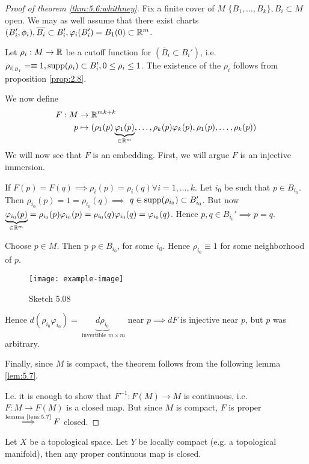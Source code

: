 \begin{proof}[Proof of theorem \ref{thm:5.6:whithney}]
    Fix a finite cover of \(M\) \(\{B_1,\dots,B_k\},B_i\subset M\) open. We may as well assume 
    that there exist charts \((B_i',\phi_i),\overline{B_i}\subset B_i',\varphi_i(B_i')=B_1(0)\subset \mathbb{R}^m\).

    Let \(\rho_i:M\to \mathbb{R}\) be a cutoff function for \((\overline{B}_i\subset B_i')\), i.e. \(\rho_{i\mid_{B_i}}=\equiv 1,\text{supp} (\rho_i)\subset B_i',0\leq \rho_i\leq 1\).
    The existence of the \(\rho_i\) follows from proposition \ref{prop:2.8}. 

    We now define 
    \begin{align*}
        F:M&\to \mathbb{R}^{mk+k}\\
        p&\mapsto (\rho_1(p)\underbrace{\varphi_1(p)}_{\in \mathbb{R}^m},\dots,\rho_k(p)\varphi_k(p),\rho_1(p),\dots,\rho_k(p))
    \end{align*}
    We will now see that \(F\) is an embedding. First, we will argue \(F\) is an injective immersion.

    If \(F(p)=F(q)\implies \rho_i(p)=\rho_i(q)\forall i=1,\dots,k\). Let \(i_0\) be such that \(p\in B_{i_0}\). Then 
    \(\rho_{i_0}(p)=1=\rho_{i_0}(q)\implies\) \(q\in \text{supp}(\rho_{i_0})\subset B_{i_0}'\). But 
    now \(\underbrace{\varphi_{i_0}(p)}_{\in\mathbb{R}^m} = \rho_{i_0}(p)\varphi_{i_0}(p)=\rho_{i_0}(q)\varphi_{i_0}(q)=\varphi_{i_0}(q)\). Hence \(p,q\in B_{i_0}'\implies p=q\).

     Choose \(p\in M\). Then p \(p\in B_{i_0}\), for some 
    \(i_0\). Hence \(\rho_{i_0}\equiv 1\) for some neighborhood of \(p\).
    \begin{figure}[H]
        \centering
        \texttt{[image: example-image]}
        \caption{Sketch 5.08}
    \end{figure}
    Hence \(d(\rho_{i_0}\varphi_{i_0})=\underbrace{d\rho_{i_0}}_{\text{ invertible }m\times m}\) near \(p\implies dF\) is injective near \(p\), but \(p\) was arbitrary.

    Finally,
    since \(M\) is compact, the theorem follows from the following lemma \ref{lem:5.7}.

    I.e. it is enough to show that \(F^{-1}:F(M)\to M\) is continuous, i.e. 
    \(F:M\to F(M)\) is a closed map. But since \(M\) is compact, \(F\) is proper \(\stackrel{\text{lemma \ref{lem:5.7}}}{\implies} F\) closed.

\end{proof}


\begin{lemma}\label{lem:5.7}
    Let \(X\) be a topological space. Let \(Y\) be locally compact (e.g. a topological manifold),
    then any proper continuous map %
    is closed.
\end{lemma}